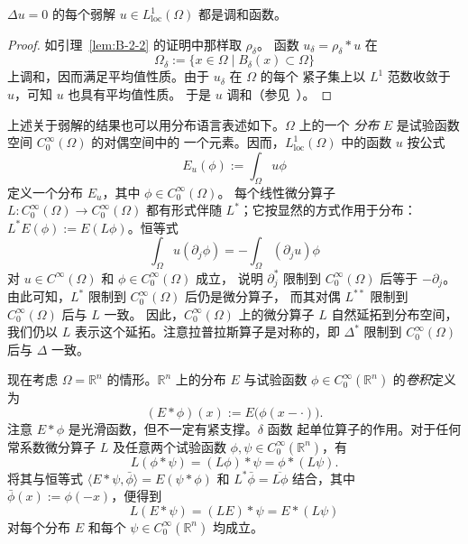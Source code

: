 \begin{lemma}[Weyl 引理]\label{lem:B-2-3}
$\Delta u=0$ 的每个弱解 $u\in L^1_{\mathrm{loc}}(\Omega)$ 都是调和函数。
\end{lemma}

\begin{proof}
如引理~\ref{lem:B-2-2} 的证明中那样取 $\rho_\delta$。
函数 $u_\delta=\rho_\delta*u$ 在
\[
  \Omega_\delta:=\{x\in\Omega\mid B_\delta(x)\subset\Omega\}
\]
上调和，因而满足平均值性质。由于 $u_\delta$ 在 $\Omega$ 的每个
紧子集上以 $L^1$ 范数收敛于 $u$，可知 $u$ 也具有平均值性质。
于是 $u$ 调和（参见~）。
\end{proof}

上述关于弱解的结果也可以用分布语言表述如下。$\Omega$ 上的一个
\emph{分布} $E$ 是试验函数空间 $C_0^\infty(\Omega)$ 的对偶空间中的
一个元素。因而，$L^1_{\mathrm{loc}}(\Omega)$ 中的函数 $u$ 按公式
\[
  E_u(\phi):=\int_\Omega u\phi
\]
定义一个分布 $E_u$，其中 $\phi\in C_0^\infty(\Omega)$。
每个线性微分算子 $L:C_0^\infty(\Omega)\to C_0^\infty(\Omega)$
都有形式伴随 $L^*$；它按显然的方式作用于分布：
$L^*E(\phi):=E(L\phi)$。恒等式
\[
  \int_\Omega u(\partial_j\phi)
  =-\int_\Omega(\partial_j u)\phi
\]
对 $u\in C^\infty(\Omega)$ 和 $\phi\in C_0^\infty(\Omega)$ 成立，
说明 $\partial_j^*$ 限制到 $C_0^\infty(\Omega)$ 后等于 $-\partial_j$。
由此可知，$L^*$ 限制到 $C_0^\infty(\Omega)$ 后仍是微分算子，
而其对偶 $L^{**}$ 限制到 $C_0^\infty(\Omega)$ 后与 $L$ 一致。
因此，$C_0^\infty(\Omega)$ 上的微分算子 $L$ 自然延拓到分布空间，
我们仍以 $L$ 表示这个延拓。注意拉普拉斯算子是对称的，即
$\Delta^*$ 限制到 $C_0^\infty(\Omega)$ 后与 $\Delta$ 一致。

现在考虑 $\Omega=\mathbb R^n$ 的情形。$\mathbb R^n$ 上的分布 $E$
与试验函数 $\phi\in C_0^\infty(\mathbb R^n)$ 的\emph{卷积}定义为
\[
  (E*\phi)(x):=E\bigl(\phi(x-\cdot)\bigr).
\]
注意 $E*\phi$ 是光滑函数，但不一定有紧支撑。$\delta$ 函数
起单位算子的作用。对于任何常系数微分算子 $L$ 及任意两个试验函数
$\phi,\psi\in C_0^\infty(\mathbb R^n)$，有
\[
  L(\phi*\psi)=(L\phi)*\psi=\phi*(L\psi).
\]
将其与恒等式
$\langle E*\psi,\bar\phi\rangle=E(\psi*\phi)$ 和
$L^*\bar\phi=\overline{L\phi}$ 结合，其中
$\bar\phi(x):=\phi(-x)$，便得到
\begin{equation}\label{eq:B-2-2}
  L(E*\psi)=(LE)*\psi=E*(L\psi)
\end{equation}
对每个分布 $E$ 和每个 $\psi\in C_0^\infty(\mathbb R^n)$ 均成立。

